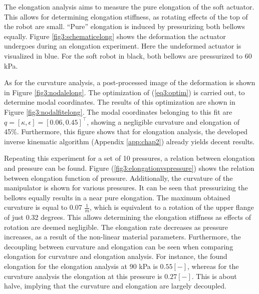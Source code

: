 The elongation analysis aims to measure the pure elongation of the soft actuator. This allows for determining elongation stiffness, as rotating effects of the top of the robot are small. ``Pure'' elongation is induced by pressurizing both bellows equally. Figure \ref{fig3:schematicelong} shows the deformation the actuator undergoes during an elongation experiment. Here the undeformed actuator is visualized in blue. For the soft robot in black, both bellows are pressurized to 60 kPa. 

As for the curvature analysis, a post-processed image of the deformation is shown in Figure \ref{fig3:nodalelong}. The optimization of (\ref{eq3:optim}) is carried out, to determine modal coordinates. The results of this optimization are shown in Figure \ref{fig3:nodalfitelong}. The modal coordinates belonging to this fit are  $q = [\kappa,\epsilon] = [0.06, 0.45]^\top$, showing a negligible curvature and elongation of 45\%. Furthermore, this figure shows that for elongation analysis, the developed inverse kinematic algorithm (Appendix \ref{app:chap2}) already yields decent results.  

Repeating this experiment for a set of 10 pressures, a relation between elongation and pressure can be found. Figure (\ref{fig3:elongationvspressure}) shows the relation between elongation function of pressure. Additionally, the curvature of the manipulator is shown for various pressures. It can be seen that pressurizing the bellows equally results in a near pure elongation. The maximum obtained curvature is equal to 0.07 $\frac{1}{m}$, which is equivalent to a rotation of the upper flange of just 0.32 degrees. This allows determining the elongation stiffness as effects of rotation are deemed negligible. The elongation rate decreases as pressure increases, as a result of the non-linear material parameters. Furthermore, the decoupling between curvature and elongation can be seen when comparing elongation for curvature and elongation analysis. For instance, the found elongation for the elongation analysis at 90 kPa is $0.55 [-]$, whereas for the curvature analysis the elongation at this pressure is $0.27 [-]$. This is about halve, implying that the curvature and elongation are largely decoupled.



